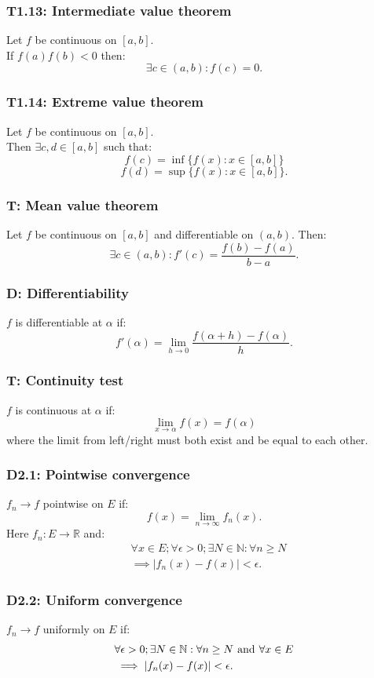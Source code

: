 \documentclass{article}
\begin{document}
\begin{multicols*}{3}
\subsubsection*{T1.13: Intermediate value theorem}
Let $f$ be continuous on $[a,b]$. \\
If $f(a)f(b)<0$ then:
$$\exists c\in(a,b):f(c)=0.$$

\subsubsection*{T1.14: Extreme value theorem}
Let $f$ be continuous on $[a,b]$. \\
Then $\exists c,d\in[a,b]$ such that:
$$f(c)=\inf\{f(x):x\in[a,b]\}$$
$$f(d)=\sup\{f(x):x\in[a,b]\}.$$

\subsubsection*{T: Mean value theorem}
Let $f$ be continuous on $[a,b]$
and differentiable on $(a,b)$.
Then:
$$\exists c\in(a,b):f'(c)=\frac{f(b)-f(a)}{b-a}.$$

\subsubsection*{D: Differentiability}
$f$ is differentiable at $\alpha$ if:
$$f'(\alpha)=\lim_{h\rightarrow0}
\frac{f(\alpha+h)-f(\alpha)}{h}.$$

\subsubsection*{T: Continuity test}
$f$ is continuous at $\alpha$ if:
$$\lim_{x\rightarrow\alpha}f(x)=f(\alpha)$$
where the limit from left/right must both exist
and be equal to each other.

\subsubsection*{D2.1: Pointwise convergence}
$f_n\rightarrow f$ pointwise on $E$ if:
$$f(x)=\lim_{n\rightarrow\infty}f_n(x).$$
Here $f_n:E\rightarrow\mathbb{R}$ and:
\begin{align*}
    &\forall x\in E;\forall\epsilon>0;
    \exists N\in\mathbb{N}:\forall n\geq N \\
    &\implies |f_n(x)-f(x)|<\epsilon.
\end{align*}

\subsubsection*{D2.2: Uniform convergence}
$f_n\rightarrow f$ uniformly on $E$ if:
\begin{align*}
    &\forall\epsilon>0;
    \exists N\in\mathbb{N}:\forall n\geq N
    \hspace{0.05in}\text{and}\hspace{0.05in}
    \forall x\in E \\
    &\implies |f_n(x)-f(x)|<\epsilon.
\end{align*}


\end{multicols*}
\end{document}
